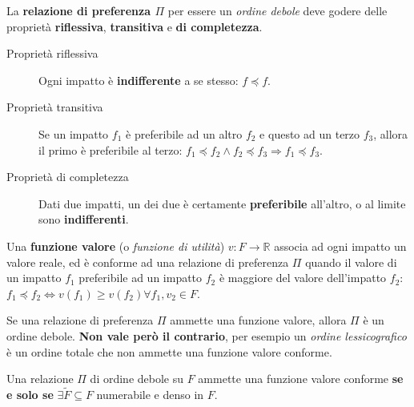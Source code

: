 \documentclass[\main/main.tex]{subfiles}
\begin{document}
\vspace{5mm}

La \textbf{relazione di preferenza $\Pi$} per essere un \textit{ordine debole} deve godere delle proprietà \textbf{riflessiva}, \textbf{transitiva} e \textbf{di completezza}.

\begin{description}
	\item [Proprietà riflessiva] Ogni impatto è \textbf{indifferente} a se stesso: $f \preceq f$.
	\item [Proprietà transitiva] Se un impatto $f_1$ è preferibile ad un altro $f_2$ e questo ad un terzo $f_3$, allora il primo è preferibile al terzo: $f_1 \preceq f_2 \land f_2 \preceq f_3 \Rightarrow f_1 \preceq f_3$.
	\item [Proprietà di completezza] Dati due impatti, un dei due è certamente \textbf{preferibile} all'altro, o al limite sono \textbf{indifferenti}.
\end{description}

\vspace{5mm}

Una \textbf{funzione valore} (o \textit{funzione di utilità}) $v: F \rightarrow \mathbb{R}$ associa ad ogni impatto un valore reale, ed è conforme ad una relazione di preferenza $\Pi$ quando il valore di un impatto $f_1$ preferibile ad un impatto $f_2$ è maggiore del valore dell'impatto $f_2$: $f_1 \preceq f_2 \Leftrightarrow v(f_1) \geq v(f_2) \forall f_1, v_2 \in F$.

Se una relazione di preferenza $\Pi$ ammette una funzione valore, allora $\Pi$ è un ordine debole. \textbf{Non vale però il contrario}, per esempio un \textit{ordine lessicografico} è un ordine totale che non ammette una funzione valore conforme.

Una relazione $\Pi$ di ordine debole su $F$ ammette una funzione valore conforme \textbf{se e solo se} $\exists \tilde{F} \subseteq F$ numerabile e denso in $F$.
\end{document}
